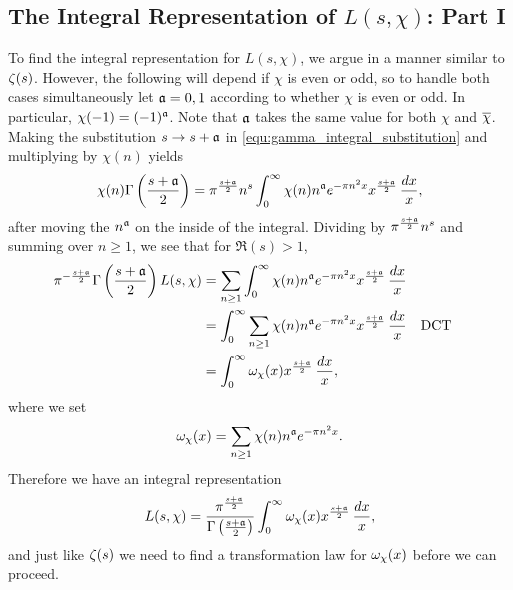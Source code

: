     \subsection*{The Integral Representation of \texorpdfstring{$L(s,\chi)$}{L(s,\chi)}: Part I}
      To find the integral representation for $L(s,\chi)$, we argue in a manner similar to $\zeta(s)$. However, the following will depend if $\chi$ is even or odd, so to handle both cases simultaneously let $\mathfrak{a} = 0,1$ according to whether $\chi$ is even or odd. In particular, $\chi(-1) = (-1)^{\mathfrak{a}}$. Note that $\mathfrak{a}$ takes the same value for both $\chi$ and $\overline{\chi}$. Making the substitution $s \to s+\mathfrak{a}$ in \cref{equ:gamma_integral_substitution} and multiplying by $\chi(n)$ yields
      \[
        \chi(n)\Gamma\left(\frac{s+\mathfrak{a}}{2}\right) = \pi^{\frac{s+\mathfrak{a}}{2}} n^{s}\int_{0}^{\infty}\chi(n)n^{\mathfrak{a}}e^{-\pi n^{2}x}x^{\frac{s+\mathfrak{a}}{2}}\,\frac{dx}{x},
      \]
      after moving the $n^{\mathfrak{a}}$ on the inside of the integral. Dividing by $\pi^{\frac{s+\mathfrak{a}}{2}}n^{s}$ and summing over $n \ge 1$, we see that for $\Re(s) > 1$,
      \begin{align*}
        \pi^{-\frac{s+\mathfrak{a}}{2}}\Gamma\left(\frac{s+\mathfrak{a}}{2}\right)L(s,\chi) &= \sum_{n \ge 1}\int_{0}^{\infty}\chi(n)n^{\mathfrak{a}}e^{-\pi n^{2}x}x^{\frac{s+\mathfrak{a}}{2}}\,\frac{dx}{x} \\
        &= \int_{0}^{\infty}\sum_{n \ge 1}\chi(n)n^{\mathfrak{a}}e^{-\pi n^{2}x}x^{\frac{s+\mathfrak{a}}{2}}\,\frac{dx}{x} && \text{DCT} \\
        &= \int_{0}^{\infty}\omega_{\chi}(x)x^{\frac{s+\mathfrak{a}}{2}}\,\frac{dx}{x},
      \end{align*}
      where we set
      \[
        \omega_{\chi}(x) = \sum_{n \ge 1}\chi(n)n^{\mathfrak{a}}e^{-\pi n^{2}x}.
      \]
      Therefore we have an integral representation
      \begin{equation}\label{equ:integral_representation_Dirichlet_L-functions_1}
        L(s,\chi) = \frac{\pi^{\frac{s+\mathfrak{a}}{2}}}{\Gamma\left(\frac{s+\mathfrak{a}}{2}\right)}\int_{0}^{\infty}\omega_{\chi}(x)x^{\frac{s+\mathfrak{a}}{2}}\,\frac{dx}{x},
      \end{equation}
      and just like $\zeta(s)$ we need to find a transformation law for $\omega_{\chi}(x)$ before we can proceed.
